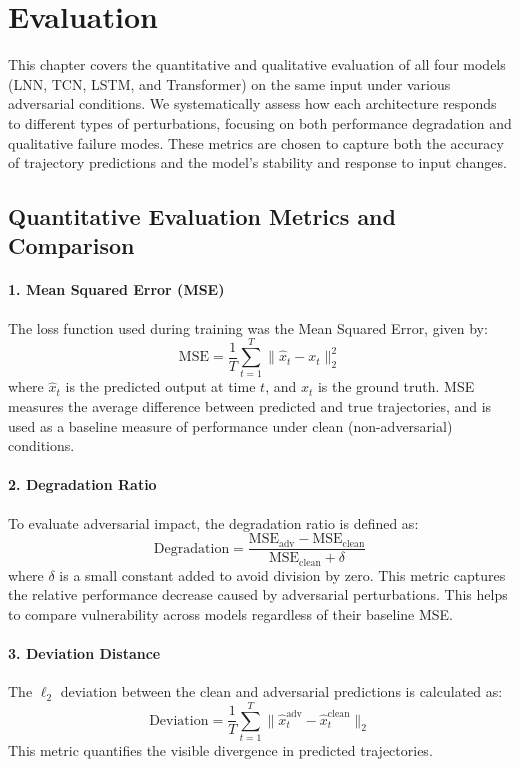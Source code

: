 \chapter{Evaluation}
\label{chap:evaluation}

This chapter covers the quantitative and qualitative evaluation of all four models (LNN, TCN, LSTM, and Transformer) on the same input under various adversarial conditions. We systematically assess how each architecture responds to different types of perturbations, focusing on both performance degradation and qualitative failure modes. These metrics are chosen to capture both the accuracy of trajectory predictions and the model's stability and response to input changes.

\section{Quantitative Evaluation Metrics and Comparison}

\subsubsection*{1. Mean Squared Error (MSE)}
The loss function used during training was the Mean Squared Error, given by:
\[
\text{MSE} = \frac{1}{T} \sum_{t=1}^{T} \| \hat{x}_t - x_t \|_2^2
\]
where $\hat{x}_t$ is the predicted output at time $t$, and $x_t$ is the ground truth. MSE measures the average difference between predicted and true trajectories, and is used as a baseline measure of performance under clean (non-adversarial) conditions.

\subsubsection*{2. Degradation Ratio}
To evaluate adversarial impact, the degradation ratio is defined as:
\[
\text{Degradation} = \frac{\text{MSE}_{\text{adv}} - \text{MSE}_{\text{clean}}}{\text{MSE}_{\text{clean}} + \delta}
\]
where $\delta$ is a small constant added to avoid division by zero. This metric captures the relative performance decrease caused by adversarial perturbations. This helps to compare vulnerability across models regardless of their baseline MSE.

\subsubsection*{3. Deviation Distance}
The $\ell_2$ deviation between the clean and adversarial predictions is calculated as:
\[
\text{Deviation} = \frac{1}{T} \sum_{t=1}^{T} \| \hat{x}_t^{\text{adv}} - \hat{x}_t^{\text{clean}} \|_2
\]
This metric quantifies the visible divergence in predicted trajectories.

